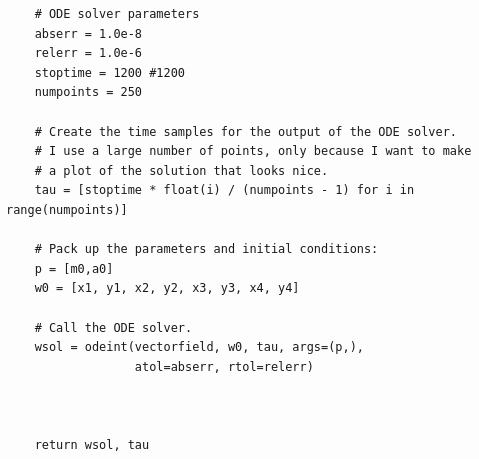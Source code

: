 \documentclass[10pt,a4paper]{report}
\begin{document}
\begin{verbatim}
    # ODE solver parameters
    abserr = 1.0e-8
    relerr = 1.0e-6
    stoptime = 1200 #1200
    numpoints = 250

    # Create the time samples for the output of the ODE solver.
    # I use a large number of points, only because I want to make
    # a plot of the solution that looks nice.
    tau = [stoptime * float(i) / (numpoints - 1) for i in range(numpoints)]

    # Pack up the parameters and initial conditions:
    p = [m0,a0]
    w0 = [x1, y1, x2, y2, x3, y3, x4, y4]

    # Call the ODE solver.
    wsol = odeint(vectorfield, w0, tau, args=(p,),
                  atol=abserr, rtol=relerr)



    return wsol, tau
\end{verbatim}

\normalsize
\end{document}
